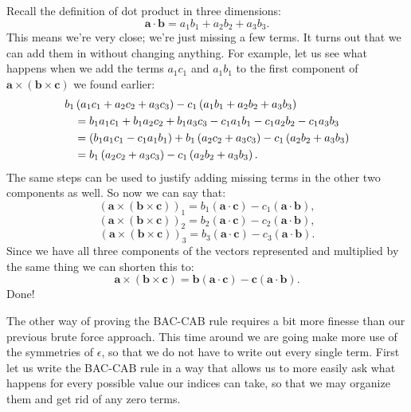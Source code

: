 Recall the definition of dot product in three dimensions:
\[ \textbf{a} \cdot \textbf{b} = a_1 b_1 + a_2 b_2 + a_3 b_3. \]
This means we're very close; we're just missing a few terms.  It turns out that we can add them in without changing anything.  For example, let us see what happens when we add the terms $a_1 c_1$ and $a_1 b_1$ to the first component of $\textbf{a} \times (\textbf{b} \times \textbf{c} )$ we found earlier:
\begin{align}
b_1 &\left(a_1 c_1 + a_2 c_2 + a_3 c_3\right) - c_1 \left(a_1 b_1 + a_2 b_2 + a_3 b_3 \right) \notag\\
&= b_1 a_1 c_1 + b_1 a_2 c_2 + b_1 a_3 c_3 - c_1 a_1 b_1 - c_1 a_2 b_2 - c_1 a_3 b_3 \notag\\
&= \left(b_1 a_1 c_1 - c_1 a_1 b_1 \right) + b_1 \left(a_2 c_2 + a_3 c_3\right) - c_1 \left( a_2 b_2 + a_3 b_3 \right) \notag\\
&=b_1 \left(a_2 c_2 + a_3 c_3\right) - c_1 \left(a_2 b_2 + a_3 b_3 \right). \notag
\end{align}
The same steps can be used to justify adding missing terms in the other two components as well.  So now we can say that:
\[ \left(\textbf{a} \times (\textbf{b} \times \textbf{c}) \right)_1 = b_1 \left(\textbf{a} \cdot \textbf{c}\right) - c_1 \left(\textbf{a} \cdot \textbf{b}\right), \]
\[ \left(\textbf{a} \times (\textbf{b} \times \textbf{c}) \right)_2 = b_2 \left(\textbf{a} \cdot \textbf{c}\right) - c_2 \left(\textbf{a} \cdot \textbf{b}\right), \]
\[ \left(\textbf{a} \times (\textbf{b} \times \textbf{c}) \right)_3 = b_3 \left(\textbf{a} \cdot \textbf{c}\right) - c_3 \left(\textbf{a} \cdot \textbf{b}\right). \]
Since we have all three components of the vectors represented and multiplied by the same thing we can shorten this to:
\[ \textbf{a} \times \left( \textbf{b} \times \textbf{c} \right) = \textbf{b} \left( \textbf{a} \cdot \textbf{c} \right) - \textbf{c} \left( \textbf{a} \cdot \textbf{b} \right). \]
Done!

The other way of proving the BAC-CAB rule requires a bit more finesse than our previous brute force approach.  This time around we are going make more use of the symmetries of 
$\epsilon$, so that we do not have to write out every single term.  First let us write the BAC-CAB rule in a way that allows us to more easily ask what happens for every 
possible value our indices can take, so that we may organize them and get rid of any zero terms.

